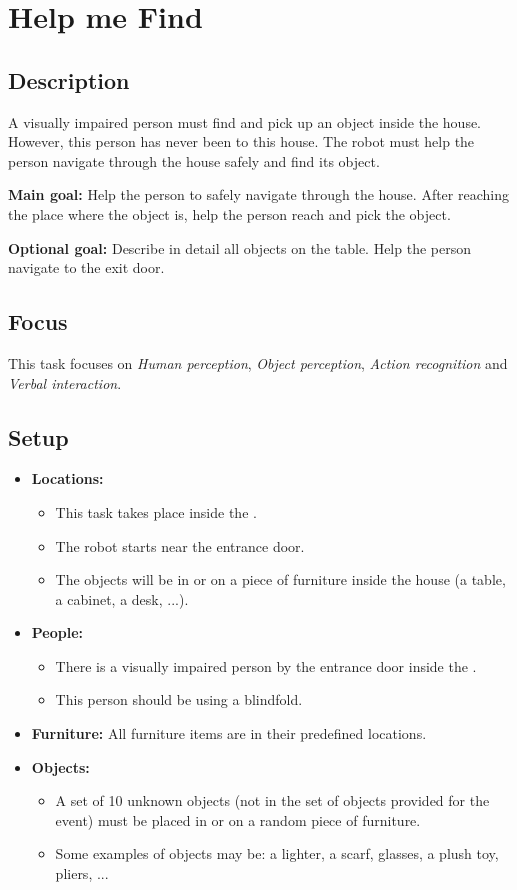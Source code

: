 \section{Help me Find}
\label{test:help-me-find}

\subsection*{Description}
A visually impaired person must find and pick up an object inside the house. However, this person has never been to this house. The robot must help the person navigate through the house safely and find its object.

\textbf{Main goal:}
Help the person to safely navigate through the house. After reaching the place where the object is, help the person reach and pick the object.

\textbf{Optional goal:}
Describe in detail all objects on the table.
Help the person navigate to the exit door.


\subsection*{Focus}
This task focuses on
\textit{Human perception},
\textit{Object perception},
\textit{Action recognition} and
\textit{Verbal interaction}.

\subsection*{Setup}
\begin{itemize}[nosep]	
	\item \textbf{Locations:} 
	\begin{itemize}
		\item This task takes place inside the \Arena{}.
		\item The robot starts near the entrance door.
		\item The objects will be in or on a piece of furniture inside the house (a table, a cabinet, a desk, ...).
	\end{itemize}	 
	\item \textbf{People:} 
	\begin{itemize}
		\item There is a visually impaired person by the entrance door inside the \Arena{}.
		\item This person should be using a blindfold.
	\end{itemize}
	\item \textbf{Furniture:} All furniture items are in their predefined locations.
	\item \textbf{Objects:} 
	\begin{itemize}
		\item A set of 10 unknown objects (not in the set of objects provided for the event) must be placed in or on a random piece of furniture.
		\item Some examples of objects may be: a lighter, a scarf, glasses, a plush toy, pliers, ...
	\end{itemize}
\end{itemize}

